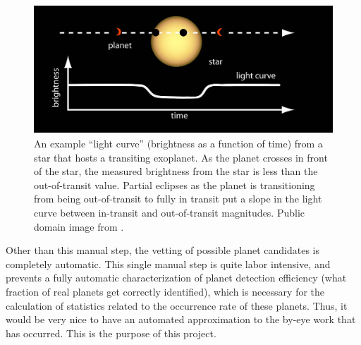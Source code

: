 \begin{figure}
\begin{centering}
\includegraphics[height=1.9in]{transit.png}
\caption{\label{transit} An example ``light curve'' (brightness as a function of time) from a star that hosts a transiting exoplanet.  As the planet crosses in front of the star, the measured brightness from the star is less than the out-of-transit value.  Partial eclipses as the planet is transitioning from being out-of-transit to fully in transit put a slope in the light curve between in-transit and out-of-transit magnitudes.  Public domain image from \cite{transit_pic}.}
\end{centering}
\end{figure}

Other than this manual step, the vetting of possible planet candidates is completely automatic.  This single manual step is quite labor intensive, and prevents a fully automatic characterization of planet detection efficiency (what fraction of real planets get correctly identified), which is necessary for the calculation of statistics related to the occurrence rate of these planets.  Thus, it would be very nice to have an automated approximation to the by-eye work that has occurred.  This is the purpose of this project.